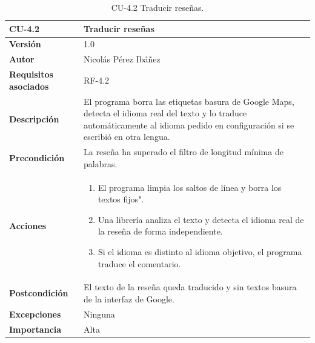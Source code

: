 \begin{table}[p]
	\centering
	\begin{tabularx}{\linewidth}{ p{} p{} }
		\toprule
		\textbf{CU-4.2}  & \textbf{Traducir reseñas}\\
		\toprule
		\textbf{Versión}              & 1.0    \\
		\textbf{Autor}                & Nicolás Pérez Ibáñez \\
		\textbf{Requisitos asociados} & RF-4.2 \\
		\textbf{Descripción}          & El programa borra las etiquetas basura de Google Maps, detecta el idioma real del texto y lo traduce automáticamente al idioma pedido en configuración si se escribió en otra lengua. \\
		\textbf{Precondición}         & La reseña ha superado el filtro de longitud mínima de palabras. \\
		\textbf{Acciones}             &
		\begin{enumerate}
			\def\labelenumi{\arabic{enumi}.}
			\tightlist
			\item El programa limpia los saltos de línea y borra los textos fijos".
			\item Una librería analiza el texto y detecta el idioma real de la reseña de forma independiente.
			\item Si el idioma es distinto al idioma objetivo, el programa traduce el comentario.
		\end{enumerate}\\
		\textbf{Postcondición}        & El texto de la reseña queda traducido y sin textos basura de la interfaz de Google. \\
		\textbf{Excepciones}          & Ninguna \\
		\textbf{Importancia}          & Alta \\
		\bottomrule
	\end{tabularx}
	\caption{CU-4.2 Traducir reseñas.}
\end{table}

